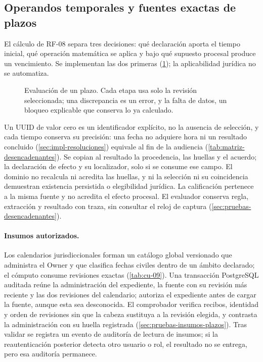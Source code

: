 \subsection{Operandos temporales y fuentes exactas de plazos}\label{sec:implementacion-desencadenantes}

El cálculo de RF-08 separa tres decisiones: qué declaración aporta el tiempo inicial, qué operación matemática se aplica y bajo qué supuesto procesal produce un vencimiento. Se implementan las dos primeras (\cref{fig:impl-evaluacion}); la aplicabilidad jurídica no se automatiza.

\begin{figure}[!htbp]
  \centering
  
  \caption{Evaluación de un plazo. Cada etapa usa solo la revisión seleccionada; una discrepancia es un error, y la falta de datos, un bloqueo explicable que conserva lo ya calculado.}
  \label{fig:impl-evaluacion}
\end{figure}

Un UUID de valor cero es un identificador explícito, no la ausencia de selección, y cada tiempo conserva su precisión: una fecha no adquiere hora ni un resultado concluido (\cref{sec:impl-resoluciones}) equivale al fin de la audiencia (\cref{tab:matriz-desencadenantes}). Se copian al resultado la procedencia, las huellas y el acuerdo; la declaración de efecto y su localizador, solo si se consume ese campo. El dominio no recalcula ni acredita las huellas, y ni la selección ni su coincidencia demuestran existencia persistida o elegibilidad jurídica. La calificación pertenece a la misma fuente y no acredita el efecto procesal. El evaluador conserva regla, extracción y resultado con traza, sin consultar el reloj de captura (\cref{sec:pruebas-desencadenantes}).

\paragraph{Insumos autorizados.} Los calendarios jurisdiccionales forman un catálogo global versionado que administra el Owner y que clasifica fechas civiles dentro de un ámbito declarado; el cómputo consume revisiones exactas (\cref{tab:cu-09}). Una transacción PostgreSQL auditada reúne la administración del expediente, la fuente con su revisión más reciente y las dos revisiones del calendario; autoriza el expediente antes de cargar la fuente, aunque esta sea desconocida. El comprobador verifica recibos, identidad y orden de revisiones sin que la cabeza sustituya a la revisión elegida, y contrasta la administración con su huella registrada (\cref{sec:pruebas-insumos-plazos}). Tras validar se registra un evento de auditoría de lectura de insumos; si la reautenticación posterior detecta otro usuario o rol, el resultado no se entrega, pero esa auditoría permanece.

